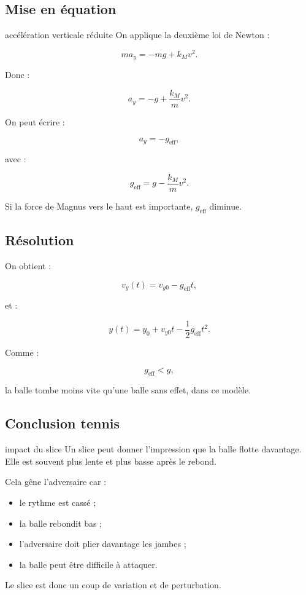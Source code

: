 \documentclass[11pt,a4paper]{article}
\begin{document}
\subsection{Mise en équation}

\begin{equationbox}{accélération verticale réduite}
On applique la deuxième loi de Newton :

\[
ma_y=-mg+k_Mv^2.
\]

Donc :

\[
a_y=-g+\frac{k_M}{m}v^2.
\]

On peut écrire :

\[
a_y=-g_{\text{eff}},
\]

avec :

\[
g_{\text{eff}}=g-\frac{k_M}{m}v^2.
\]

Si la force de Magnus vers le haut est importante, $g_{\text{eff}}$ diminue.
\end{equationbox}

\subsection{Résolution}

On obtient :

\[
v_y(t)=v_{y0}-g_{\text{eff}}t,
\]

et :

\[
y(t)=y_0+v_{y0}t-\frac12g_{\text{eff}}t^2.
\]

Comme :

\[
g_{\text{eff}}<g,
\]

la balle tombe moins vite qu'une balle sans effet, dans ce modèle.

\subsection{Conclusion tennis}

\begin{tennis}{impact du slice}
Un slice peut donner l'impression que la balle flotte davantage. Elle est souvent plus lente et plus basse après le rebond.

Cela gêne l'adversaire car :
\begin{itemize}
    \item le rythme est cassé ;
    \item la balle rebondit bas ;
    \item l'adversaire doit plier davantage les jambes ;
    \item la balle peut être difficile à attaquer.
\end{itemize}

Le slice est donc un coup de variation et de perturbation.
\end{tennis}
\end{document}
